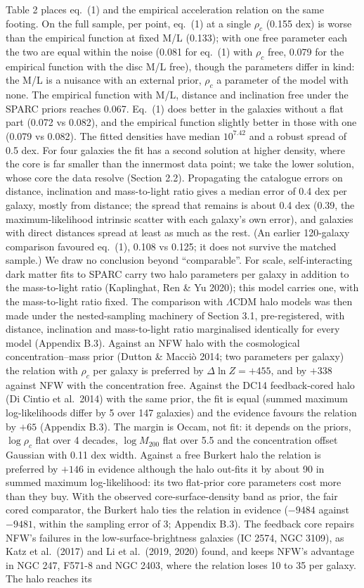 \documentclass[
  10pt,
]{article}
\begin{document}
Table 2 places eq.~(1) and the empirical acceleration relation on the
same footing. On the full sample, per point, eq.~(1) at a single $\rho_c$ (0.155 dex) is worse than the empirical function at fixed M/L (0.133); with one free parameter each the two are equal within the noise (0.081 for eq.~(1) with $\rho_c$ free, 0.079 for the empirical function with the disc M/L free), though the parameters differ in kind: the M/L is a nuisance with an external prior, $\rho_c$ a parameter of the model with none. The empirical function with M/L, distance and inclination free under the SPARC priors reaches 0.067. Eq.~(1) does better in the galaxies without a flat part (0.072 vs 0.082), and the empirical function slightly better in those with one (0.079 vs 0.082). The fitted densities have median $10^{7.42}$ and a robust spread of 0.5 dex. For four galaxies the fit has a second solution at higher density, where the core is far smaller than the innermost data point; we take the lower solution, whose core the data resolve (Section 2.2). Propagating the catalogue errors on distance, inclination and mass-to-light ratio gives a median error of 0.4 dex per galaxy, mostly from distance; the spread that remains is about 0.4 dex (0.39, the maximum-likelihood intrinsic scatter with each galaxy's own error), and galaxies with direct distances spread at least as much as the rest. (An earlier 120-galaxy comparison favoured eq.~(1), 0.108 vs 0.125; it does not survive the matched sample.) We draw no conclusion beyond ``comparable''. For scale, self-interacting dark matter fits to SPARC carry two halo parameters per galaxy in addition to the mass-to-light ratio (Kaplinghat, Ren \& Yu 2020); this model carries one, with the mass-to-light ratio fixed. The comparison with $\Lambda$CDM halo models was then made under the nested-sampling machinery of Section 3.1, pre-registered, with distance, inclination and mass-to-light ratio marginalised identically for every model (Appendix B.3). Against an NFW halo with the cosmological concentration--mass prior (Dutton \& Macci\`o 2014; two parameters per galaxy) the relation with $\rho_c$ per galaxy is preferred by $\Delta\ln Z=+455$, and by $+338$ against NFW with the concentration free. Against the DC14 feedback-cored halo (Di Cintio et al.~2014) with the same prior, the fit is equal (summed maximum log-likelihoods differ by 5 over 147 galaxies) and the evidence favours the relation by $+65$ (Appendix B.3). The margin is Occam, not fit: it depends on the priors, $\log\rho_c$ flat over 4 decades, $\log M_{200}$ flat over 5.5 and the concentration offset Gaussian with 0.11 dex width. Against a free Burkert halo the relation is preferred by $+146$ in evidence although the halo out-fits it by about 90 in summed maximum log-likelihood: its two flat-prior core parameters cost more than they buy. With the observed core-surface-density band as prior, the fair cored comparator, the Burkert halo ties the relation in evidence ($-9484$ against $-9481$, within the sampling error of 3; Appendix B.3). The feedback core repairs NFW's failures in the low-surface-brightness galaxies (IC 2574, NGC 3109), as Katz et al.~(2017) and Li et al.~(2019, 2020) found, and keeps NFW's advantage in NGC 247, F571-8 and NGC 2403, where the relation loses 10 to 35 per galaxy. The halo reaches its 
\end{document}

